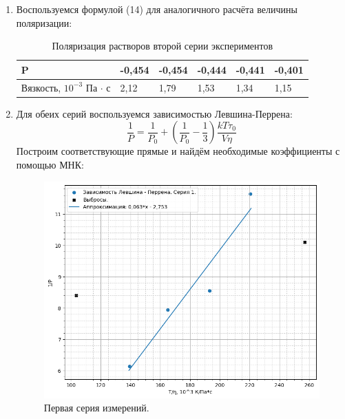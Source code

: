 \documentclass{article}
\begin{document}
\begin{enumerate}
\begin{figure}[h!]
    \end{figure}
    \item Воспользуемся формулой (14) для аналогичного расчёта величины поляризации:
    \begin{table}[h!]
    \centering
    \caption{Поляризация растворов второй серии экспериментов}
    \begin{tabular}{|l|l|l|l|l|l|}
    \hline
    P & -0,454 & -0,454 & -0,444 & -0,441 & -0,401 \\ \hline
    Вязкость, $10^{-3}$ Па $\cdot$ с & 2,12 & 1,79 & 1,53 & 1,34 & 1,15 \\ \hline
    \end{tabular}
    \end{table}
    \item Для обеих серий воспользуемся зависимостью Левшина-Перрена:
    \begin{equation}
        \frac{1}{P} = \frac{1}{P_0} + \left( \frac{1}{P_0} - \frac{1}{3}\right)\frac{kT\tau_0}{V\eta}
    \end{equation}
    Построим соответствующие прямые и найдём необходимые коэффициенты с помощью МНК:
    \begin{figure}[!htb]
                 \includegraphics[width=\linewidth]{Images/Фото 3.png}
                 \caption{Первая серия измерений.}
                  \endminipage\hfill

\end{figure}
\end{enumerate}
\end{document}
